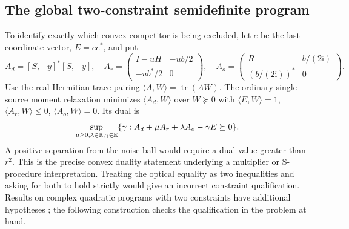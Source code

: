 \documentclass[anonymous,12pt]{iopjournal}
\theoremstyle{remark}\newtheorem{remark}[theorem]{Remark}
\newcommand{\tr}{\operatorname{tr}}\newcommand{\diag}{\operatorname{diag}}
\numberwithin{equation}{section}
\begin{document}
\subsection{The global two-constraint semidefinite program}
To identify exactly which convex competitor is being excluded, let $e$ be the last coordinate vector, $E=ee^*$, and put
\[
 A_d=[S,-y]^*[S,-y],\quad
 A_r=\begin{pmatrix}I-uH&-ub/2\\-ub^*/2&0\end{pmatrix},\quad
 A_o=\begin{pmatrix}R&b/(2\mathrm i)\\(b/(2\mathrm i))^*&0\end{pmatrix}.
\]
Use the real Hermitian trace pairing $\langle A,W\rangle=\tr(AW)$. The ordinary single-source moment relaxation minimizes $\langle A_d,W\rangle$ over $W\succeq0$ with $\langle E,W\rangle=1$, $\langle A_r,W\rangle\le0$, $\langle A_o,W\rangle=0$. Its dual is
\begin{equation}
 \sup_{\mu\ge0,\lambda\in\mathbb R,\gamma\in\mathbb R}
 \{\gamma:A_d+\mu A_r+\lambda A_o-\gamma E\succeq0\}.\label{eq:sdpdual}
\end{equation}
A positive separation from the noise ball would require a dual value greater than $r^2$. This is the precise convex duality statement underlying a multiplier or S-procedure interpretation. Treating the optical equality as two inequalities and asking for both to hold strictly would give an incorrect constraint qualification. Results on complex quadratic programs with two constraints have additional hypotheses \cite{beck}; the following construction checks the qualification in the problem at hand.
\end{document}
